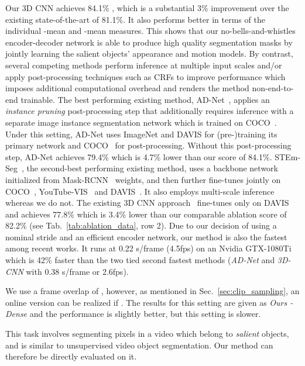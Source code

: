 \documentclass{bmvc2k_arxiv}
\newcommand{\PAR}[1]{\vskip4pt \noindent {\bf #1~}}
\begin{document}
Our 3D CNN achieves 84.1\% , which is a substantial 3\% improvement over the existing state-of-the-art of 81.1\%. It also performs better in terms of the individual -mean and -mean measures.
This shows that our no-bells-and-whistles encoder-decoder network is able to produce high quality segmentation masks by jointly learning the salient objects' appearance and motion models. 
By contrast, several competing methods perform inference at multiple input scales and/or apply post-processing techniques such as CRFs to improve performance which imposes additional computational overhead and renders the method non-end-to-end trainable. 
The best performing existing method, AD-Net~\cite{Yang19ICCVAnchorDiff}, applies an \textit{instance pruning} post-processing step that additionally requires inference with a separate image instance segmentation network which is trained on COCO~\cite{Lin14ECCV}. Under this setting, AD-Net uses ImageNet and DAVIS for (pre-)training its primary network and COCO~\cite{Lin14ECCV} for post-processing. Without this post-processing step, AD-Net achieves 79.4\%  which is 4.7\% lower than our score of 84.1\%. STEm-Seg~\cite{athar20arxiv}, the second-best performing existing method, uses a backbone network initialized from Mask-RCNN~\cite{He17ICCV} weights, and then further fine-tunes jointly on COCO~\cite{Lin14ECCV}, YouTube-VIS~\cite{Yang19ICCV} and DAVIS~\cite{Perazzi16CVPR}. It also employs multi-scale inference whereas we do not.
The existing 3D CNN approach~\cite{Hou19BMVC} fine-tunes only on DAVIS and achieves 77.8\%  which is 3.4\% lower than our comparable ablation score of 82.2\% (see Tab.~\ref{tab:ablation_data}, row 2).
Due to our decision of using a nominal stride and an efficient encoder network, our method is also the fastest among recent works. It runs at 0.22 s/frame (4.5fps) on an Nvidia GTX-1080Ti which is 42\% faster than the two tied second fastest methods (\textit{AD-Net} and \textit{3D-CNN} with 0.38 s/frame or 2.6fps).


We use a frame overlap of , however, as mentioned in Sec.~\ref{sec:clip_sampling}, an online version can be realized if . The results for this setting are given as \textit{Ours - Dense} and the performance is slightly better, but this setting is slower.  



\PAR{Video Object Saliency:} This task involves segmenting pixels in a video which belong to \textit{salient} objects, and is similar to unsupervised video object segmentation. Our method can therefore be directly evaluated on it. 
\end{document}
